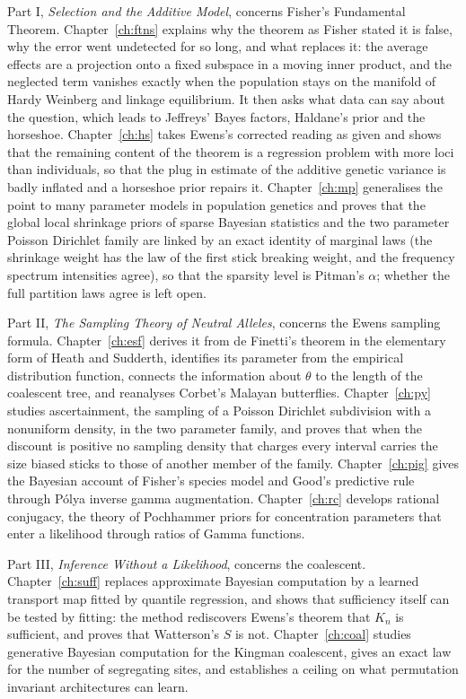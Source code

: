 Part I, \emph{Selection and the Additive Model}, concerns Fisher's Fundamental Theorem.
Chapter~\ref{ch:ftns} explains why the theorem as Fisher stated it is false, why the error went
undetected for so long, and what replaces it: the average effects are a projection onto a fixed
subspace in a moving inner product, and the neglected term vanishes exactly when the population
stays on the manifold of Hardy Weinberg and linkage equilibrium. It then asks what data can say
about the question, which leads to Jeffreys' Bayes factors, Haldane's prior and the horseshoe.
Chapter~\ref{ch:hs} takes Ewens's corrected reading as given and shows that the remaining content
of the theorem is a regression problem with more loci than individuals, so that the plug in
estimate of the additive genetic variance is badly inflated and a horseshoe prior repairs it.
Chapter~\ref{ch:mp} generalises the point to many parameter models in population genetics and
proves that the global local shrinkage priors of sparse Bayesian statistics and the two
parameter Poisson Dirichlet family are linked by an exact identity of marginal laws (the shrinkage weight has the law of the first stick breaking weight, and the frequency spectrum intensities agree), so that the sparsity level is Pitman's $\alpha$; whether the full partition laws agree is left open.

Part II, \emph{The Sampling Theory of Neutral Alleles}, concerns the Ewens sampling formula.
Chapter~\ref{ch:esf} derives it from de Finetti's theorem in the elementary form of Heath and
Sudderth, identifies its parameter from the empirical distribution function, connects the
information about $\theta$ to the length of the coalescent tree, and reanalyses Corbet's Malayan
butterflies. Chapter~\ref{ch:py} studies ascertainment, the sampling of a Poisson Dirichlet
subdivision with a nonuniform density, in the two parameter family, and proves that when the discount is positive no sampling
density that charges every interval carries the size biased sticks to those of another member of the family. Chapter~\ref{ch:pig} gives the Bayesian account of Fisher's species
model and Good's predictive rule through P\'olya inverse gamma augmentation. Chapter~\ref{ch:rc}
develops rational conjugacy, the theory of Pochhammer priors for concentration parameters that
enter a likelihood through ratios of Gamma functions.

Part III, \emph{Inference Without a Likelihood}, concerns the coalescent. Chapter~\ref{ch:suff}
replaces approximate Bayesian computation by a learned transport map fitted by quantile regression,
and shows that sufficiency itself can be tested by fitting: the method rediscovers Ewens's theorem
that $K_n$ is sufficient, and proves that Watterson's $S$ is not. Chapter~\ref{ch:coal} studies
generative Bayesian computation for the Kingman coalescent, gives an exact law for the number of
segregating sites, and establishes a ceiling on what permutation invariant architectures can
learn.

